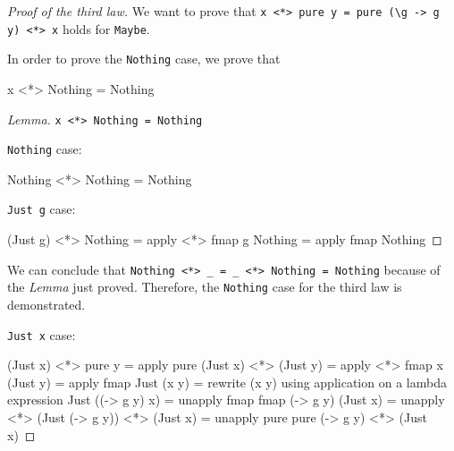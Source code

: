 \documentclass[12pt]{article}
\newenvironment{code}{\endgraf\verbatim}{\endverbatim}
\begin{document}
\begin{proof}[Proof of the third law]
We want to prove that \verb|x <*> pure y = pure (\g -> g y) <*> x| holds for \verb|Maybe|.

In order to prove the \verb|Nothing| case, we prove that

\begin{code}
x <*> Nothing = Nothing
\end{code}

\begin{proof}[Lemma] \verb|x <*> Nothing = Nothing|

\verb|Nothing| case:

\begin{code}
  Nothing <*> Nothing = Nothing
\end{code}

\verb|Just g| case:

\begin{code}
  (Just g) <*> Nothing
=   { apply <*> }
  fmap g Nothing
=   { apply fmap }
  Nothing
\end{code}
\end{proof}

We can conclude that \verb|Nothing <*> _ = _ <*> Nothing = Nothing| because of the \emph{Lemma} just proved. Therefore, the \verb|Nothing| case for the third law is demonstrated.


\verb|Just x| case:

\begin{code}
  (Just x) <*> pure y
=   { apply pure }
  (Just x) <*> (Just y)
=   { apply <*> }
  fmap x (Just y)
=   { apply fmap }
  Just (x y)
=   { rewrite (x y) using application on a lambda expression }
  Just ((\g -> g y) x)
=   { unapply fmap }
  fmap (\g -> g y) (Just x)
=   { unapply <*> }
  (Just (\g -> g y)) <*> (Just x)
=   { unapply pure }
  pure (\g -> g y) <*> (Just x)
\end{code}
\end{proof}
\end{document}
